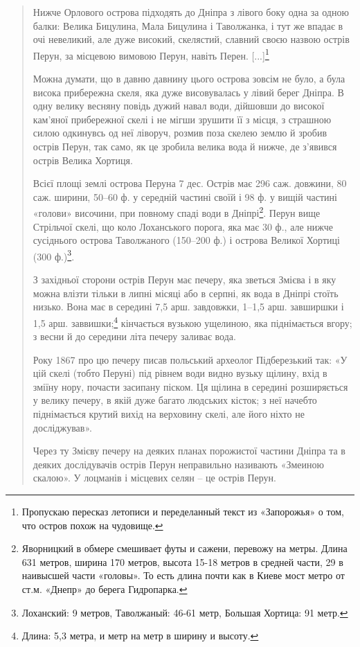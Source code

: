 \begin{quotation}
Нижче Орлового острова підходять до Дніпра з лівого боку одна за одною балки: Велика Бицулина, Мала Бицулина і Таволжанка, і тут же впадає в очі невеликий, але дуже високий, скелястий, славний своєю назвою острів Перун, за місцевою вимовою Перун, навіть Перен. [...]\footnote{Пропускаю пересказ летописи и переделанный текст из «Запорожья» о том, что остров похож на чудовище.}

Можна думати, що в давню давнину цього острова зовсім не було, а була висока прибережна скеля, яка дуже висовувалась у лівий берег Дніпра. В одну велику весняну повідь дужий навал води, дійшовши до високої кам'яної прибережної скелі і не мігши зрушити її з місця, з страшною силою одкинувсь од неї ліворуч, розмив поза скелею землю й зробив острів Перун, так само, як це зробила велика вода й нижче, де з'явився острів Велика Хортиця.

Всієї площі землі острова Перуна 7 дес. Ост\-рів має 296 саж. довжини, 80 саж. ширини, 50–60 ф. у середній частині своїй і 98 ф. у вищій частині «голови» височини, при повному спаді води в Дніпрі\footnote{Яворницкий в обмере смешивает футы и сажени, перевожу на метры. Длина 631 метров, ширина 170 метров, высота 15-18 метров в средней части, 29 в наивысшей части «головы». То есть длина почти как в Киеве мост метро от ст.м. «Днепр» до берега Гидропарка.}. Перун вище Стрільчої скелі, що коло Лоханського порога, яка має 30 ф., але нижче сусіднього острова Таволжаного (150–200 ф.) і острова Великої Хортиці (300 ф.)\footnote{Лоханский: 9 метров, Таволжаный: 46-61 метр, Большая Хортица: 91 метр.}.

З західньої сторони острів Перун має печеру, яка зветься Змієва і в яку можна влізти тільки в липні місяці або в серпні, як вода в Дніпрі стоїть низько. Вона має в середині 7,5 арш. завдовжки, 1–1,5 арш. завширшки і 1,5 арш. заввишки;\footnote{Длина: 5,3 метра, и метр на метр в ширину и высоту.} кінчається вузькою ущелиною, яка піднімається вгору; з весни й до середини літа печеру заливає вода.

Року 1867 про цю печеру писав польський археолог Підберезький так: «У цій скелі (тобто Перуні) під рівнем води видно вузьку щілину, вхід в зміїну нору, почасти засипану піском. Ця щілина в середині розширяється у велику печеру, в якій дуже багато людських кісток; з неї начебто піднімається крутий вихід на верховину скелі, але його ніхто не досліджував».

Через ту Змієву печеру на деяких планах порожистої частини Дніпра та в деяких дослідувачів острів Перун неправильно називають «Змеиною скалою». У лоцманів і місцевих селян – це острів Перун.


\end{quotation}
